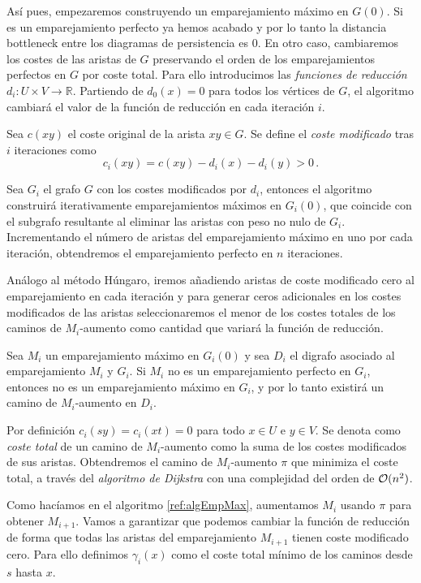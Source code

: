 Así pues, empezaremos construyendo un emparejamiento máximo en $G(0)$. Si es un emparejamiento perfecto ya hemos acabado y por lo tanto la distancia bottleneck entre los diagramas de persistencia es $0$. En otro caso, cambiaremos los costes de las aristas de $G$ preservando el orden de los emparejamientos perfectos en $G$ por coste total. Para ello introducimos las \emph{funciones de reducción} $d_i: U \times V \to \mathbb{R}$. Partiendo de $d_0(x)=0$ para todos los vértices de $G$, el algoritmo cambiará el valor de la función de reducción en cada iteración $i$.

\begin{definition}
Sea $c(xy)$ el coste original de la arista $xy \in G$. Se define el \emph{coste modificado} tras $i$ iteraciones como
\[
c_i(xy) = c(xy) - d_i(x) - d_i(y) > 0\,.
\]
\end{definition}

Sea $G_i$ el grafo $G$ con los costes modificados por $d_i$, entonces el algoritmo construirá iterativamente emparejamientos máximos en $G_i(0)$, que coincide con el subgrafo resultante al eliminar las aristas con peso no nulo de $G_i$. Incrementando el número de aristas del emparejamiento máximo en uno por cada iteración, obtendremos el emparejamiento perfecto en $n$ iteraciones.

Análogo al método Húngaro, iremos añadiendo aristas de coste modificado cero al emparejamiento en cada iteración y para generar ceros adicionales en los costes modificados de las aristas seleccionaremos el menor de los costes totales de los caminos de $M_i$-aumento como cantidad que variará la función de reducción.

Sea $M_i$ un emparejamiento máximo en $G_i(0)$ y sea $D_i$ el digrafo asociado al emparejamiento $M_i$ y $G_i$. Si $M_i$ no es un emparejamiento perfecto en $G_i$, entonces no es un emparejamiento máximo en $G_i$, y por lo tanto existirá un camino de $M_i$-aumento en $D_i$.

Por definición $c_i(sy) = c_i(xt) = 0$ para todo $x \in U$ e $y \in V$. Se denota como \emph{coste total} de un camino de $M_i$-aumento como la suma de los costes modificados de sus aristas. Obtendremos el camino de $M_i$-aumento $\pi$ que minimiza el coste total, a través del \emph{algoritmo de Dijkstra} con una complejidad del orden de $\mathcal{O}(n^2)$.

Como hacíamos en el algoritmo \ref{ref:algEmpMax}, aumentamos $M_i$ usando $\pi$ para obtener $M_{i+1}$. Vamos a garantizar que podemos cambiar la función de reducción de forma que todas las aristas del emparejamiento $M_{i+1}$ tienen coste modificado cero. Para ello definimos $\gamma_i(x)$ como el coste total mínimo de los caminos desde $s$ hasta $x$.

